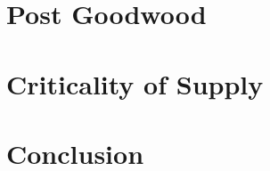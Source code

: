 \documentclass[noraggedright]{turabian-researchpaper}
\begin{document}
\section{Post Goodwood}



\section{} %


\section{Criticality of Supply}






\section{Conclusion}

\newpage

\printbibliography
\end{document}
